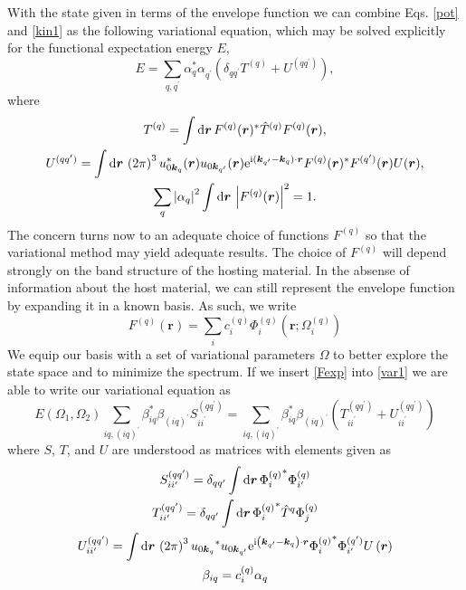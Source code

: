 With the state given in terms of the envelope function we can combine
Eqs. \eqref{pot} and \eqref{kin1} as the following variational
equation, which may be solved explicitly for the functional
expectation energy $E$,
\begin{equation}
  E
  =
  \sum_{q,q^\prime}\alpha_{q}^*\alpha_{q^\prime}^{}
  \left(\delta_{qq^\prime}T^{(q)} + U^{(qq^\prime)}\right),
  \label{var1}
\end{equation}
where 
\begin{gather}
  T^{(q)}
  =
  \int\mathrm{d}\bm{r}\,
  F^{(q)}(\bm{r})^{*}\hat{T}^{(q)}F^{(q)}(\bm{r}),
  \label{tidef}\\
  U^{(qq^\prime)}
  =
  \int\mathrm{d}\bm{r}\,
  \left(2\pi\right)^{3}
  u^{*}_{0\bm{k}_{q}}(\bm{r})u_{0\bm{k}_{q^\prime}}(\bm{r})
  \mathrm{e}^{\mathrm{i}(\bm{k}_{q^\prime}-\bm{k}_{q})\cdot\bm{r}}
  F^{(q)}(\bm{r})^{*}F^{(q^\prime)}(\bm{r})
  U(\bm{r})
  , \\
  \sum_{q}\left|\alpha_{q}\right|^2
  \int\mathrm{d}\bm{r}\,
  \left|F^{(q)}(\bm{r})\right|^2
  =
  1.
\end{gather}
The concern turns now to an adequate choice of functions $F^{(q)}$ so that
the variational method may yield adequate results. The choice of $F^{(q)}$
will depend strongly on the band structure of the hosting material. In
the absense of information about the host material, we can still
represent the envelope function by expanding it in a known basis. As
such, we write
\begin{equation}
  F^{(q)}\left(\bm{r}\right)
  =
  \sum_{i} c_{i}^{(q)} \Phi^{(q)}_{i}\left(\bm{r};\Omega_{i}^{(q)}\right)
  \label{Fexp}
\end{equation}
We equip our basis with a set of variational parameters $\Omega$ to
better explore the state space and to minimize the spectrum. If we
insert \eqref{Fexp} into \eqref{var1} we are able to write our
variational equation as
\begin{equation}
  E\left(\Omega_1,\Omega_2\right)
  \sum_{iq,(iq)^\prime}
  \beta_{iq}^{*}
  \beta_{(iq)^\prime}
  S_{ii^\prime}^{(qq^\prime)}
  =
  \sum_{iq,(iq)^\prime}
  \beta_{iq}^{*}
  \beta_{(iq)^\prime}
  \left(T_{ii^\prime}^{(qq^\prime)} + U_{ii^\prime}^{(qq^\prime)}\right)
\end{equation}
where $S$, $T$, and $U$ are understood as matrices with elements given as
\begin{gather}
  S_{ii^\prime}^{(qq^\prime)} 
  =
  \delta_{qq^\prime}
  \int
  \mathrm{d}\bm{r}\,
  {\Phi^{(q)}_{i}}^{*}
  \Phi^{(q)}_{i^\prime} \\
  T_{ii^\prime}^{(qq^\prime)}
  =
  \delta_{qq^\prime}
  \int
  \mathrm{d}\bm{r}\,
  {\Phi^{(q)}_{i}}^{*}
  \hat{T}^{q}
  \Phi^{(q)}_{j} \\
  U_{ii^\prime}^{(qq^\prime)}
  =
  \int
  \mathrm{d}\bm{r}\,
  \left(2\pi\right)^{3}
  {u_{0\bm{k}_{q}}}^{*}
  u_{0\bm{k}_{q^\prime}}
  \mathrm{e}^{\mathrm{i}\left(\bm{k}_{q^\prime}-\bm{k}_{q}\right)\cdot\bm{r}}
  {\Phi_{i}^{(q)}}^{*}
  {\Phi_{i^\prime}^{(q^\prime)}}
  U\left(\bm{r}\right) \\
  \beta_{iq}
  =
  c_{i}^{(q)}\alpha_{q}
\end{gather}
